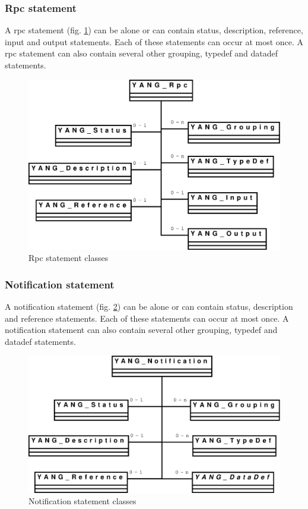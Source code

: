\documentclass[a4paper]{article}
\begin{document}
\subsubsection{Rpc statement}

A rpc statement (fig.  \ref{rpc})  can be alone or can contain status,
description, reference,  input and  output statements.  Each  of these
statements can occur  at most once.  A rpc  statement can also contain
several other grouping, typedef and datadef statements.
\begin{figure}[htbp]
\begin{center}
\includegraphics[scale = .3]{rpc.eps}
\end{center}
\caption{Rpc statement classes}
\label{rpc}
\end{figure}

\subsubsection{Notification statement}

A notification  statement (fig.   \ref{notification}) can be  alone or
can  contain status,  description and  reference statements.   Each of
these statements can occur at  most once. A notification statement can
also contain several other grouping, typedef and datadef statements.
\begin{figure}[htbp]
\begin{center}
\includegraphics[scale = .3]{notification.eps}
\end{center}
\caption{Notification statement classes}
\label{notification}
\end{figure}
\end{document}
